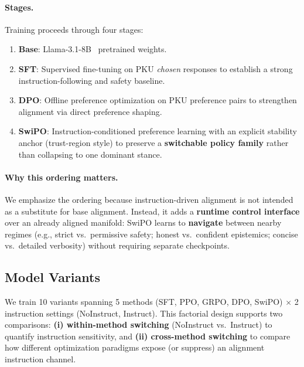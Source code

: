 \vspace{-0.2em}
\paragraph{\textbf{Stages.}}
Training proceeds through four stages:

\begin{enumerate}[leftmargin=*,itemsep=1pt]
    \item \textbf{Base}: Llama-3.1-8B~\cite{dubey2024llama} pretrained weights.
    \item \textbf{SFT}: Supervised fine-tuning on PKU \emph{chosen} responses to establish a strong instruction-following and safety baseline.
    \item \textbf{DPO}: Offline preference optimization on PKU preference pairs to strengthen alignment via direct preference shaping.
    \item \textbf{SwiPO}: Instruction-conditioned preference learning with an explicit stability anchor (trust-region style) to preserve a \textbf{switchable policy family} rather than collapsing to one dominant stance.
\end{enumerate}

\vspace{-0.2em}
\paragraph{\textbf{Why this ordering matters.}}
We emphasize the ordering because instruction-driven alignment is not intended as a substitute for base alignment.
Instead, it adds a \textbf{runtime control interface} over an already aligned manifold:
SwiPO learns to \textbf{navigate} between nearby regimes (e.g., strict vs.\ permissive safety; honest vs.\ confident epistemics; concise vs.\ detailed verbosity) without requiring separate checkpoints.

\vspace{-1mm}
\subsection{Model Variants}
\label{sec:model_variants}

We train 10 variants spanning 5 methods (SFT, PPO, GRPO, DPO, SwiPO) $\times$ 2 instruction settings (NoInstruct, Instruct).
This factorial design supports two comparisons:
\textbf{(i) within-method switching} (NoInstruct vs.\ Instruct) to quantify instruction sensitivity, and
\textbf{(ii) cross-method switching} to compare how different optimization paradigms expose (or suppress) an alignment instruction channel.

